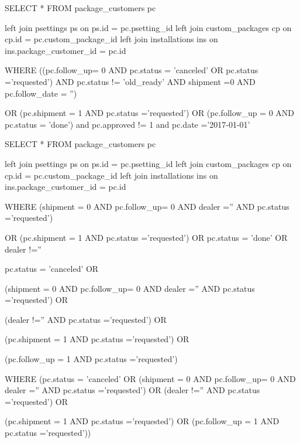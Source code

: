 



SELECT * FROM package_customers pc 

left join psettings ps on ps.id = pc.psetting_id 
left join custom_packages cp on cp.id = pc.custom_package_id 
left join installations ins on ins.package_customer_id = pc.id 

WHERE ((pc.follow_up= 0 AND pc.status = 'canceled' OR pc.status ='requested') 
AND pc.status != 'old_ready' AND shipment =0 AND pc.follow_date = '') 

OR (pc.shipment = 1 AND pc.status ='requested') 
OR (pc.follow_up = 0 AND pc.status = 'done')
and pc.approved != 1 and pc.date ='2017-01-01'





SELECT * FROM package_customers pc 

left join psettings ps on ps.id = pc.psetting_id 
left join custom_packages cp on cp.id = pc.custom_package_id 
left join installations ins on ins.package_customer_id = pc.id 

WHERE (shipment = 0 AND pc.follow_up= 0 AND dealer =''  AND pc.status ='requested') 

OR (pc.shipment = 1 AND pc.status ='requested') 
OR  pc.status = 'done' OR dealer !='' 



pc.status = 'canceled' OR

(shipment = 0 AND pc.follow_up= 0 AND dealer ='' AND pc.status ='requested') OR

(dealer !='' AND pc.status ='requested') OR

(pc.shipment = 1 AND pc.status ='requested') OR

(pc.follow_up = 1 AND pc.status ='requested') 


WHERE  (pc.status = 'canceled' OR (shipment = 0 AND pc.follow_up= 0 AND dealer ='' AND pc.status ='requested') OR (dealer !='' AND pc.status ='requested') OR

(pc.shipment = 1 AND pc.status ='requested') OR (pc.follow_up = 1 AND pc.status ='requested'))